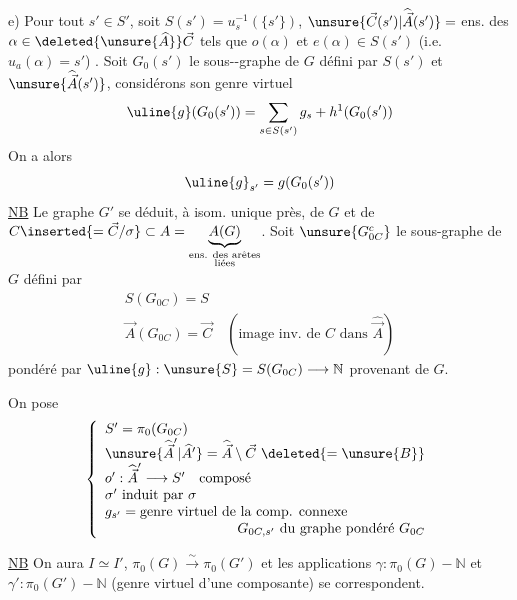 e) Pour tout $s'\in S'$, soit $S(s')=u_s^{-1}(\{s'\})$, $\unsure{\vec C(s')|\widehat{\vec A}(s')}=$ ens. des $\alpha\in\deleted{\unsure{\widehat A}}\vec C$ tels que
$o(\alpha)$ et $e(\alpha)\in S(s')$
(i.e. $u_a(\alpha)=s'$)
.
Soit  $G_0(s')$ le sous--graphe  de $G$ défini par $S(s')$ et $\unsure{\widehat{\vec A}(s')}$, considérons son genre virtuel
\[
\uline{g}(G_0(s'))=\sum_{s\in S(s')}g_s+h^1(G_0(s'))
\]
On a alors
\[
\uline{g}_{s'}=g(G_0(s'))
\]
\uline{NB} Le graphe  $G'$ se déduit, à isom. unique près, de $G$ et de $C\inserted{=\vec C/\sigma}\subset A=\underbrace{A(G)}_{\substack{\text{ens. des arêtes}\\\text{liées}}}$.
Soit $\unsure{G_{0C}^{c}}$ le sous-graphe de $G$ défini par
\[
\begin{array}{l}
S(G_{0C})=S\\
\vec A(G_{0C})=\vec C\quad(\text{image inv. de }C\text{ dans }\widehat{\vec A})
\end{array}
\]
pondéré par $\uline{g}:\unsure{S}=S(G_{0C})\longrightarrow\mathbb N$ provenant de $G$.

On pose
\[
\left\{\begin{array}{l}
S'=\pi_0(G_{0C})\\
\unsure{\widehat{\vec A}'|\widehat A'}=\widehat{\vec A}\setminus\vec C\ \deleted{=\unsure{B}}\\
o':\widehat{\vec A}'\longrightarrow S'\quad\text{composé}\\
\sigma'\ \text{induit par }\sigma\\
g_{s'}=\text{genre virtuel de la comp. connexe}\\
\hfill G_{0C,s'}\ \text{du graphe pondéré }G_{0C}
\end{array}\right.
\]

\uline{NB} On aura $I\simeq I'$, $\pi_0(G)\xrightarrow{\sim}\pi_0(G')$ et les applications $\gamma:\pi_0(G)-\mathbb N$ et $\gamma':\pi_0(G')-\mathbb N$ (genre virtuel d'une composante) se correspondent.

